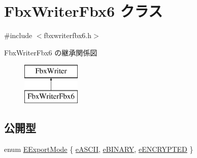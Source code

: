 \hypertarget{class_fbx_writer_fbx6}{}\section{Fbx\+Writer\+Fbx6 クラス}
\label{class_fbx_writer_fbx6}


{\ttfamily \#include $<$fbxwriterfbx6.\+h$>$}

Fbx\+Writer\+Fbx6 の継承関係図\begin{figure}[H]
\begin{center}
\leavevmode
\includegraphics[height=2.000000cm]{class_fbx_writer_fbx6}
\end{center}
\end{figure}
\subsection*{公開型}
\begin{DoxyCompactItemize}
\item 
enum \hyperlink{class_fbx_writer_fbx6_a8fd1f1f068e0ba64fe7694877bf15f21}{E\+Export\+Mode} \{ \hyperlink{class_fbx_writer_fbx6_a8fd1f1f068e0ba64fe7694877bf15f21ad381511f67f9345183cd7e0aa72e839a}{e\+A\+S\+C\+II}, 
\hyperlink{class_fbx_writer_fbx6_a8fd1f1f068e0ba64fe7694877bf15f21a852bc8a6a84f0f6957780342811531bb}{e\+B\+I\+N\+A\+RY}, 
\hyperlink{class_fbx_writer_fbx6_a8fd1f1f068e0ba64fe7694877bf15f21a0a6f7a69636978813fe20284108fc656}{e\+E\+N\+C\+R\+Y\+P\+T\+ED}
 \}
\end{DoxyCompactItemize}
